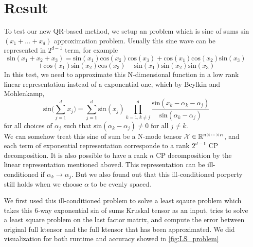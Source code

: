 \documentclass{article}
\newcommand{\T}[2][]{#1{\mathbf{\cal{#2}}}} 						%
\begin{document}
\section{Result}
To test our new QR-based method, we setup an problem which is sine of sums sin$(x_1+\dots+ x_d)$ approximation problem.
Usually this sine wave can be represented in $2^{d-1}$ term, for example
$$\text{sin}(x_1+x_2+x_3) = \text{sin}(x_1)\text{cos}(x_2)\text{cos}(x_3)+\text{cos}(x_1)\text{cos}(x_2)\text{sin}(x_3)$$
$$+\text{cos}(x_1)\text{sin}(x_2)\text{cos}(x_3) - \text{sin}(x_1)\text{sin}(x_2)\text{sin}(x_3)$$
In this test, we need to approximate this N-dimensional function in a low rank linear representation instead of 
a exponential one, which by Beylkin and Mohlenkamp,
$$\text{sin}\bigl(\sum^d_{j=1}x_j\bigr) = \sum^d_{j=1}\text{sin}(x_j)\prod^d_{k=1,k\neq j}\frac{\text{sin}(x_k - \alpha_k -\alpha_j)}{\text{sin}(\alpha_k - \alpha_j)}$$
for all choices of  ${\alpha_j}$ such that $\text{sin}(\alpha_k - \alpha_j) \neq 0$ for all $j \neq k$.
\\
We can somehow treat this sine of sum be a N-mode tensor $\T{X} \in \mathbb{R}^{n \times \dots \times n}$, and each term of exponential representation
corresponde to a rank $2^{d-1}$ CP decomposition. It is also possible to have a rank $n$ CP decomposition by the linear
representation mentioned aboved. This representation can be ill-conditioned if $\alpha_k \rightarrow \alpha_j$.
But we also found out that this ill-conditioned porperty still holds when we choose $\alpha$ to be evenly spaced.

We first used this ill-conditioned problem to solve a least sqaure problem which takes this 6-way exponential sin of sums Kruskal tensor as an input,
tries to solve a least square problem on the last factor matrix, and compute the error between original full ktensor 
and the full ktensor that has been approximated. We did visualization for both runtime and accuracy showed in \cref{fig:LS_problem}
\end{document}
